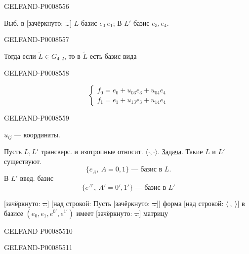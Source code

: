 \begin{GelfandAdjacentEvidence}{GELFAND-P000855}{6}


Выб. в [зачёркнуто: \sout{…}] \(L\) базис \(e_0\ e_1\); В \(L'\) базис \(e_3,e_4\).
\end{GelfandAdjacentEvidence}
\begin{GelfandAdjacentEvidence}{GELFAND-P000855}{7}

Тогда если \(\widetilde L\in G_{4,2}\), то в \(\widetilde L\) есть базис вида
\end{GelfandAdjacentEvidence}
\begin{GelfandAdjacentEvidence}{GELFAND-P000855}{8}

\[
\begin{cases}
f_0=e_0+u_{03}e_3+u_{04}e_4\\
f_1=e_1+u_{13}e_3+u_{14}e_4
\end{cases}\tag{3}
\]
\end{GelfandAdjacentEvidence}
\begin{GelfandAdjacentEvidence}{GELFAND-P000855}{9}

\(u_{ij}\) — координаты.

Пусть \(L,L'\) трансверс. и изотропные относит. \(\langle\cdot,\cdot\rangle\).
\uline{Задача}. Такие \(L\) и \(L'\) существуют.
\[
\{e_A,\ A=0,1\}\text{ — базис в } L.\tag{4}
\]
В \(L'\) введ. базис
\[
\{e^{A'},\ A'=0',1'\}\text{ — базис в } L'\tag{5}
\]

[зачёркнуто: \sout{…}] [над строкой: Пусть [зачёркнуто: \sout{…}]]
форма [над строкой: \(\langle\ ,\ \rangle\)] в базисе
\((e_0,e_1,e^{0'},e^{1'})\) имеет [зачёркнуто: \sout{…}] матрицу
\end{GelfandAdjacentEvidence}
\begin{GelfandAdjacentEvidence}{GELFAND-P000855}{10}

\end{GelfandAdjacentEvidence}
\begin{GelfandAdjacentEvidence}{GELFAND-P000855}{11}

\end{GelfandAdjacentEvidence}
